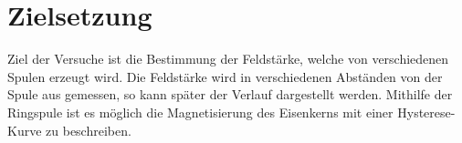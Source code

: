 \section{Zielsetzung}
\label{sec:Zielsetzung}
Ziel der Versuche ist die Bestimmung der Feldstärke, welche von verschiedenen Spulen erzeugt wird.
Die Feldstärke wird in verschiedenen Abständen von der Spule aus gemessen, so kann später der Verlauf dargestellt werden.
Mithilfe der Ringspule ist es möglich die Magnetisierung des Eisenkerns mit einer Hysterese-Kurve zu beschreiben.